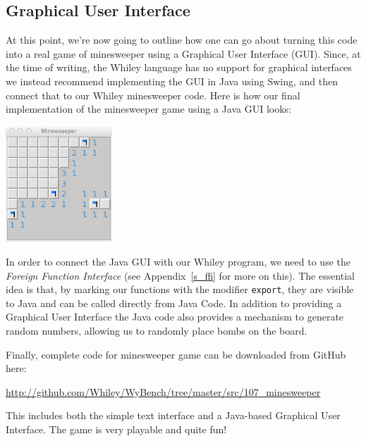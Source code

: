 \subsection{Graphical User Interface}
At this point, we're now going to outline how one can go about turning this code into a real game of minesweeper using a Graphical User Interface (GUI).  Since, at the time of writing, the Whiley language has no support for graphical interfaces we instead recommend implementing the GUI in Java using Swing, and then connect that to our Whiley minesweeper code.  Here is how our final implementation of the minesweeper game using a Java GUI looks:
\begin{center}
\includegraphics[width=0.3\textwidth]{../images/minesweeper.png}
\end{center}

In order to connect the Java GUI with our Whiley program, we need to use the {\em Foreign Function Interface} (see Appendix~\ref{s_ffi} for more on this).  The essential idea is that, by marking our functions with the modifier \lstinline{export}, they are visible to Java and can be called directly from Java Code.  In addition to providing a Graphical User Interface the Java code also provides a mechanism to generate random numbers, allowing us to randomly place bombs on the board.

Finally, complete code for minesweeper game can be downloaded from GitHub here: 
\begin{center}
\url{http://github.com/Whiley/WyBench/tree/master/src/107_minesweeper}
\end{center}
This includes both the simple text interface and a Java-based Graphical User Interface.  The game is very playable and quite fun!